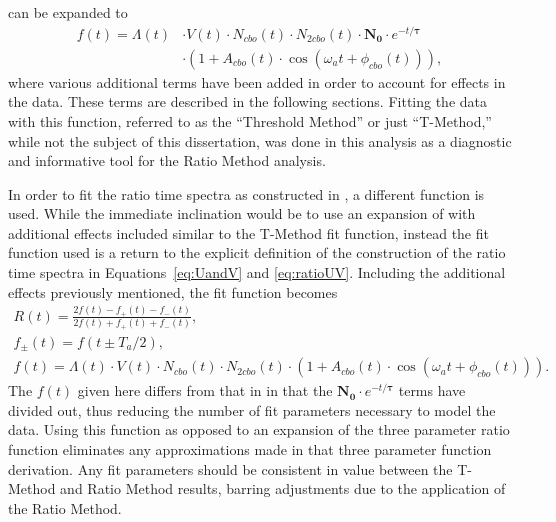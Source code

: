  can be expanded to 
    \begin{equation}
    \begin{aligned}
        f(t) = \Lambda(t)& \cdot V(t) \cdot N_{cbo}(t) \cdot N_{2cbo}(t) \cdot \boldsymbol{N_{0}} \cdot e^{-t/\boldsymbol{\tau}}  \\
         & \cdot (1 + A_{cbo}(t) \cdot \cos(\omega_{a}t + \phi_{cbo}(t))),
    \label{eq:TmethodFunction}
    \end{aligned}
    \end{equation}
where various additional terms have been added in order to account for effects in the data. These terms are described in the following sections. Fitting the data with this function, referred to as the ``Threshold Method'' or just ``T-Method,'' while not the subject of this dissertation, was done in this analysis as a diagnostic and informative tool for the Ratio Method analysis. 


In order to fit the ratio time spectra as constructed in , a different function is used. While the immediate inclination would be to use an expansion of  with additional effects included similar to the T-Method fit function, instead the fit function used is a return to the explicit definition of the construction of the ratio time spectra in Equations~\ref{eq:UandV} and \ref{eq:ratioUV}. Including the additional effects previously mentioned, the fit function becomes
    \begin{gather}
        R(t) = \frac{2f(t) - f_{+}(t) - f_{-}(t)}{2f(t) + f_{+}(t) + f_{-}(t)}, \\
        f_{\pm}(t) = f(t \pm T_{a}/2), \\
        f(t) = \Lambda(t) \cdot V(t) \cdot N_{cbo}(t) \cdot N_{2cbo}(t) \cdot (1 + A_{cbo}(t) \cdot \cos(\omega_{a}t + \phi_{cbo}(t))).
    \label{eq:fullratiofunction}
    \end{gather}
The $f(t)$ given here differs from that in  in that the $\boldsymbol{N_{0}} \cdot e^{-t/\boldsymbol{\tau}}$ terms have divided out, thus reducing the number of fit parameters necessary to model the data. Using this function as opposed to an expansion of the three parameter ratio function eliminates any approximations made in that three parameter function derivation. Any fit parameters should be consistent in value between the T-Method and Ratio Method results, barring adjustments due to the application of the Ratio Method. 

